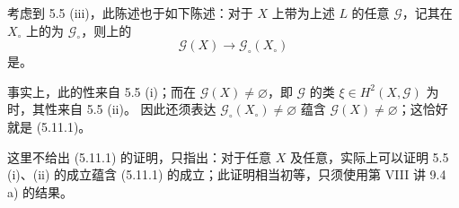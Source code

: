 考虑到 5.5 (iii)，此陈述也于如下陈述：对于 $X$ 上带为上述 $L$ 的任意 $\mathscr G$，记其在 $X_\circ$ 上的为 $\mathscr G_\circ$，则上的
\[
\mathscr G(X)\longrightarrow\mathscr G_\circ(X_\circ)
\]
是。

事实上，此的性来自 5.5 (i)；而在 $\mathscr G(X)\neq\varnothing$，即 $\mathscr G$ 的类 $\xi\in H^2(X,\mathscr G)$ 为时，其性来自 5.5 (ii)。
因此还须表达 $\mathscr G_\circ(X_\circ)\neq\varnothing$ 蕴含 $\mathscr G(X)\neq\varnothing$；这恰好就是 (5.11.1)。

这里不给出 (5.11.1) 的证明，只指出：对于任意 $X$ 及任意，实际上可以证明 5.5 (i)、(ii) 的成立蕴含 (5.11.1) 的成立；此证明相当初等，只须使用第 VIII 讲 9.4 a) 的结果。


